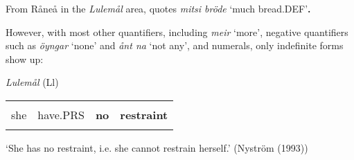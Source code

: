 \begin{styleBodyTextFirst}
From Råneå in the \textit{Lulemål} area, \citet[17]{Delsing2003a} quotes\textbf{ }\textit{mitsi bröde } ‘much bread.DEF’\textbf{. }

\end{styleBodyTextFirst}

\begin{styleBodytextC}
However, with most other quantifiers, including \textit{meir} ‘more’, negative quantifiers such as \textit{öyngar} ‘none’ and \textit{ånt na} ‘not any’, and numerals, only indefinite forms show up:

\end{styleBodytextC}

\begin{listWWNumileveli}
\item 

\begin{styleExample}
\textit{Lulemål} (Ll) 

\end{styleExample}

\end{listWWNumileveli}

\begin{listWWNumxxxvileveli}
\item 

\end{listWWNumxxxvileveli}

\begin{tabular}{llll}
\lsptoprule
\multicolumn{4}{l}{Ho

}\\
she & have.PRS & {\bfseries no} & {\bfseries restraint}\\
\lspbottomrule
\end{tabular}

\begin{styleTranslation}
‘She has no restraint, i.e. she cannot restrain herself.’ (Nyström (1993))

\end{styleTranslation}

